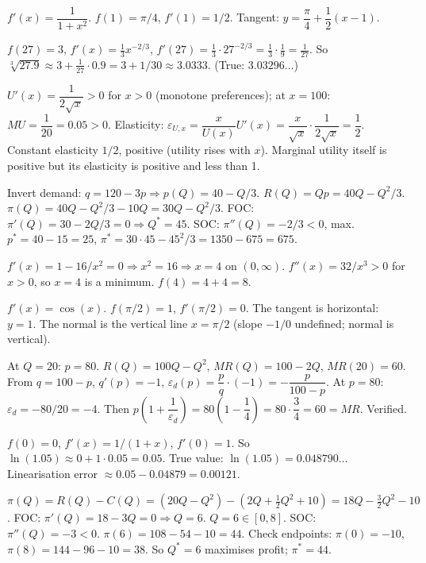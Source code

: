 \begin{solutions}
  \item $f'(x)=\dfrac{1}{1+x^2}$. $f(1)=\pi/4$, $f'(1)=1/2$. Tangent:
        $y=\dfrac{\pi}{4}+\dfrac12(x-1)$.

  \item $f(27)=3$, $f'(x)=\frac13x^{-2/3}$,
        $f'(27)=\frac13\cdot27^{-2/3}=\frac13\cdot\frac19=\frac1{27}$. So
        $\sqrt[3]{27.9}\approx3+\frac1{27}\cdot0.9=3+1/30\approx3.0333$.
        (True: $3.03296\ldots$)

  \item $U'(x)=\dfrac{1}{2\sqrt{x}}>0$ for $x>0$ (monotone preferences);
        at $x=100$: $MU=\dfrac{1}{20}=0.05>0$. Elasticity:
        $\varepsilon_{U,x}=\dfrac{x}{U(x)}U'(x)=\dfrac{x}{\sqrt{x}}
        \cdot\dfrac{1}{2\sqrt{x}}=\dfrac12$. Constant elasticity $1/2$,
        positive (utility rises with $x$). Marginal utility itself is
        positive but its elasticity is positive and less than 1.

  \item Invert demand: $q=120-3p\Rightarrow p(Q)=40-Q/3$.
        $R(Q)=Qp=40Q-Q^2/3$. $\pi(Q)=40Q-Q^2/3-10Q=30Q-Q^2/3$. FOC:
        $\pi'(Q)=30-2Q/3=0\Rightarrow Q^*=45$. SOC: $\pi''(Q)=-2/3<0$,
        max. $p^*=40-15=25$, $\pi^*=30\cdot45-45^2/3=1350-675=675$.

  \item $f'(x)=1-16/x^2=0\Rightarrow x^2=16\Rightarrow x=4$ on
        $(0,\infty)$. $f''(x)=32/x^3>0$ for $x>0$, so $x=4$ is a minimum.
        $f(4)=4+4=8$.

  \item $f'(x)=\cos(x)$. $f(\pi/2)=1$, $f'(\pi/2)=0$. The tangent is
        horizontal: $y=1$. The normal is the vertical line $x=\pi/2$
        (slope $-1/0$ undefined; normal is vertical).

  \item At $Q=20$: $p=80$. $R(Q)=100Q-Q^2$, $MR(Q)=100-2Q$, $MR(20)=60$.
        From $q=100-p$, $q'(p)=-1$,
        $\varepsilon_d(p)=\dfrac{p}{q}\cdot(-1)=-\dfrac{p}{100-p}$. At
        $p=80$: $\varepsilon_d=-80/20=-4$. Then
        $p\left(1+\dfrac{1}{\varepsilon_d}\right)=80\left(1-\dfrac14\right)
        =80\cdot\dfrac34=60=MR$. Verified.

  \item $f(0)=0$, $f'(x)=1/(1+x)$, $f'(0)=1$. So
        $\ln(1.05)\approx0+1\cdot0.05=0.05$. True value:
        $\ln(1.05)=0.048790\ldots$ Linearisation error
        $\approx0.05-0.04879=0.00121$.

  \item $\pi(Q)=R(Q)-C(Q)=(20Q-Q^2)-(2Q+\frac12Q^2+10)
        =18Q-\frac32Q^2-10$. FOC: $\pi'(Q)=18-3Q=0\Rightarrow Q=6$.
        $Q=6\in[0,8]$. SOC: $\pi''(Q)=-3<0$. $\pi(6)=108-54-10=44$. Check
        endpoints: $\pi(0)=-10$, $\pi(8)=144-96-10=38$. So $Q^*=6$
        maximises profit; $\pi^*=44$.


\end{solutions}
